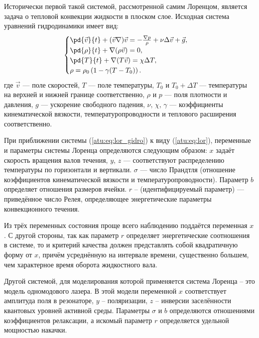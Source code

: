 Исторически первой такой системой, рассмотренной самим Лоренцом, является
задача о тепловой конвекции жидкости в плоском слое. Исходная система
уравнений гидродинамики имеет вид:
%
%
\begin{equation}
\begin{cases}
  \pd{\vec{v}}{t} + ( \vec{v} \nabla ) \vec{v} = - \frac{\nabla p}{\rho} + \nu \Delta \vec{v} + \vec{g}, \\
  \pd{\rho}{t} + \nabla ( \rho \vec{v} ) = 0 , \\
  \pd{T}{t} +\nabla ( T \vec{v} ) = \chi \Delta T , \\
  \rho = \rho_0 \left( 1 - \gamma (T - T_0) \right) .
\end{cases}
\label{atu:eq:lor_gidro}
\end{equation}
%
где
$\vec{v} $   --- поле скоростей,
$T$ --- поле температуры,
$T_0$ и $T_0+\Delta T$   --- температуры на верхней и нижней границе соответственно,
$\rho$ и $p$ --- поля плотности и давления,
$g$ --- ускорение свободного падения,
$\nu$, $\chi$, $\gamma$  --- коэффициенты кинематической вязкости, температуропроводности и
теплового расширения соответственно.

При приближении системы (\ref{atu:eq:lor_gidro}) к виду (\ref{atu:eq:lor}),
переменные и параметры системы
Лоренца определяются следующим образом: $x$ задаёт скорость вращения валов
течения, $y$, $z$ --- соответствуют распределению температуры по горизонтали и
вертикали.
$\sigma$   --- число Прандтля (отношение коэффициентов кинематической вязкости и
температуропроводности). Параметр $b$ определяет отношения размеров ячейки.
$r$ -- (идентифицируемый параметр) --- приведённое число Релея, определяющее
энергетические параметры конвекционного течения.

Из трёх переменных состояния проще всего наблюдению поддаётся переменная
$x$. С другой стороны, так как параметр $r$ определяет энергетические
соотношения в системе, то и критерий качества должен представлять собой
квадратичную форму от $x$, причём усреднённую на интервале времени,
существенно большем, чем характерное время оборота жидкостного вала.

Другой системой, для моделирования которой применяется система Лоренца --
это модель одномодового лазера. В этой модели переменной $x$ соответствует
амплитуда поля в резонаторе, $y$ -- поляризации, $z$ -- инверсии заселённости
квантовых уровней активной среды. Параметры $\sigma$ и $b$
определяются отношениями коэффициентов релаксации, а искомый параметр $r$
определяется удельной мощностью накачки.

